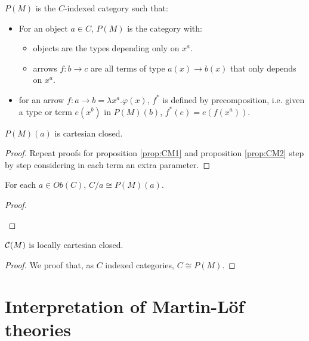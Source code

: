 \begin{definition} $P(M)$ is the $C$-indexed category such that:
  \begin{itemize}
  \item For an object $a\in C$, $P(M)$ is the category with:
    \begin{itemize}
    \item objects are the types depending only on $x^a$.
    \item arrows $f: b\to c$ are all terms of type $a(x)\to b(x)$ that only depends on $x^a$.
    \end{itemize}
  \item for an arrow $f:a\to b = \lambda x^a.\varphi(x)$, $f^*$ is defined by precomposition, i.e. given a type or term $e(x^b)$ in $P(M)(b)$, $f^*(e) = e(f(x^a))$.  
  \end{itemize}
\end{definition}

\begin{proposition}
$P(M)(a)$ is cartesian closed.
\end{proposition}
\begin{proof}
  Repeat proofs for proposition \ref{prop:CM1} and proposition \ref{prop:CM2} step by step considering in each term an extra parameter.
\end{proof}


\begin{proposition}
For each $a\in Ob(C)$, $C/a\cong P(M)(a)$.
\end{proposition}
\begin{proof}
\begin{lemma}

\end{lemma}

\begin{lemma}

\end{lemma}
\end{proof}
\begin{theorem}
  $\mathcal{C}(M)$ is locally cartesian closed.
\end{theorem}
\begin{proof}
We proof that, as $C$ indexed categories, $C\cong P(M)$.
\end{proof}
\section{Interpretation of Martin-L\"of theories}
\label{InterpretationLCC}